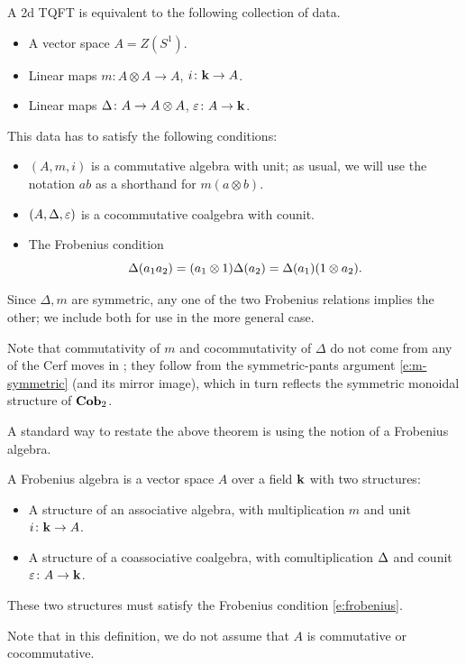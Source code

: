 \begin{theorem}\label{t:2d-classification}
  A 2d TQFT is equivalent to the following collection of data.
  \begin{itemize}
    \item A vector space $A=Z(S^1)$.
    \item Linear maps $m\colon A\otimes A\to A$, $i\colon \mathbf{k}\to A$.
    \item Linear maps $\Delta\colon A\to A\otimes A$, $\varepsilon\colon A\to \mathbf{k}$.
  \end{itemize}
  This data has to satisfy the following conditions:
  \begin{itemize}
    \item $(A,m, i)$ is a commutative algebra with unit; as usual, we will use
      the notation $ab$ as a shorthand for $m(a\otimes b)$.
    \item $(A,\Delta, \varepsilon)$ is a cocommutative coalgebra with counit.
    \item The Frobenius condition
      \begin{equation}\label{e:frobenius}
        \Delta(a_1 a_2) = (a_1\otimes 1) \Delta(a_2)= \Delta(a_1)(1\otimes a_2).
      \end{equation}
  \end{itemize}
\end{theorem}


\begin{remark}\label{r:frobenius-two}
  Since $\Delta, m$ are symmetric, any one of the two Frobenius relations
  implies the other; we include both for use in the more general case.
\end{remark}




\begin{remark}\label{r:2d-commutative}
  Note that commutativity of $m$ and cocommutativity of $\Delta$ do not come
  from any of the Cerf moves in ; they follow from the
  symmetric-pants argument \eqref{e:m-symmetric} (and its mirror image), which
  in turn reflects the symmetric monoidal structure of $\mathbf{Cob}_2$.
\end{remark}



A standard way to restate the above theorem is using the notion of a Frobenius
algebra.
\begin{definition}\label{d:frobenius}
  A Frobenius algebra is a vector space $A$ over a field $\mathbf{k}$ with two
  structures:
  \begin{itemize}
    \item A structure of an associative algebra, with multiplication $m$ and
      unit $i\colon \mathbf{k} \to A$.
    \item A structure of a coassociative coalgebra, with comultiplication $\Delta$
      and counit $\varepsilon\colon A\to \mathbf{k}$.
  \end{itemize}
  These two structures must satisfy the Frobenius condition \eqref{e:frobenius}.
\end{definition}
Note that in this definition, we do not assume that $A$ is commutative or
cocommutative.

